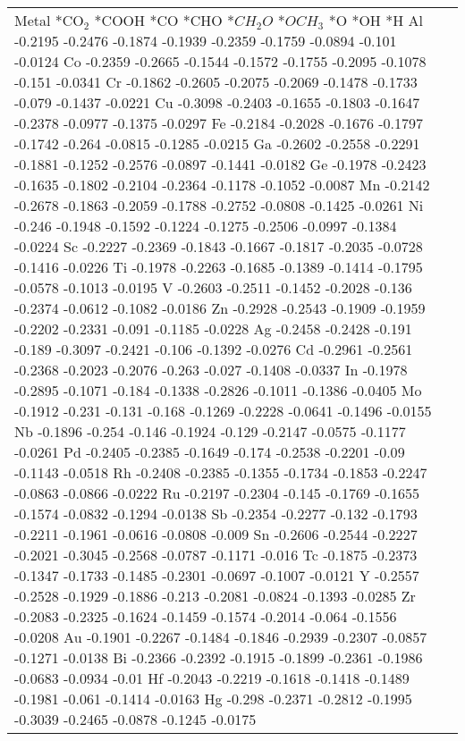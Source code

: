 \begin{table}[h]
    \centering
    \begin{tabular}{lr}
      \hline
      Metal	*CO$_2$	*COOH	*CO	*CHO	*$CH_2O$	*$OCH_3$	*O	*OH	*H
      \hline
      Al	-0.2195	-0.2476	-0.1874	-0.1939	-0.2359	-0.1759	-0.0894	-0.101	-0.0124
      Co	-0.2359	-0.2665	-0.1544	-0.1572	-0.1755	-0.2095	-0.1078	-0.151	-0.0341
      Cr	-0.1862	-0.2605	-0.2075	-0.2069	-0.1478	-0.1733	-0.079	-0.1437	-0.0221
      Cu	-0.3098	-0.2403	-0.1655	-0.1803	-0.1647	-0.2378	-0.0977	-0.1375	-0.0297
      Fe	-0.2184	-0.2028	-0.1676	-0.1797	-0.1742	-0.264	-0.0815	-0.1285	-0.0215
      Ga	-0.2602	-0.2558	-0.2291	-0.1881	-0.1252	-0.2576	-0.0897	-0.1441	-0.0182
      Ge	-0.1978	-0.2423	-0.1635	-0.1802	-0.2104	-0.2364	-0.1178	-0.1052	-0.0087
      Mn	-0.2142	-0.2678	-0.1863	-0.2059	-0.1788	-0.2752	-0.0808	-0.1425	-0.0261
      Ni	-0.246	-0.1948	-0.1592	-0.1224	-0.1275	-0.2506	-0.0997	-0.1384	-0.0224
      Sc	-0.2227	-0.2369	-0.1843	-0.1667	-0.1817	-0.2035	-0.0728	-0.1416	-0.0226
      Ti	-0.1978	-0.2263	-0.1685	-0.1389	-0.1414	-0.1795	-0.0578	-0.1013	-0.0195
      V	  -0.2603	-0.2511	-0.1452	-0.2028	-0.136	-0.2374	-0.0612	-0.1082	-0.0186
      Zn	-0.2928	-0.2543	-0.1909	-0.1959	-0.2202	-0.2331	-0.091	-0.1185	-0.0228
      Ag	-0.2458	-0.2428	-0.191	-0.189	-0.3097	-0.2421	-0.106	-0.1392	-0.0276
      Cd	-0.2961	-0.2561	-0.2368	-0.2023	-0.2076	-0.263	-0.027	-0.1408	-0.0337
      In	-0.1978	-0.2895	-0.1071	-0.184	-0.1338	-0.2826	-0.1011	-0.1386	-0.0405
      Mo	-0.1912	-0.231	-0.131	-0.168	-0.1269	-0.2228	-0.0641	-0.1496	-0.0155
      Nb	-0.1896	-0.254	-0.146	-0.1924	-0.129	-0.2147	-0.0575	-0.1177	-0.0261
      Pd	-0.2405	-0.2385	-0.1649	-0.174	-0.2538	-0.2201	-0.09	  -0.1143	-0.0518
      Rh	-0.2408	-0.2385	-0.1355	-0.1734	-0.1853	-0.2247	-0.0863	-0.0866	-0.0222
      Ru	-0.2197	-0.2304	-0.145	-0.1769	-0.1655	-0.1574	-0.0832	-0.1294	-0.0138
      Sb	-0.2354	-0.2277	-0.132	-0.1793	-0.2211	-0.1961	-0.0616	-0.0808	-0.009
      Sn	-0.2606	-0.2544	-0.2227	-0.2021	-0.3045	-0.2568	-0.0787	-0.1171	-0.016
      Tc	-0.1875	-0.2373	-0.1347	-0.1733	-0.1485	-0.2301	-0.0697	-0.1007	-0.0121
      Y	  -0.2557	-0.2528	-0.1929	-0.1886	-0.213	-0.2081	-0.0824	-0.1393	-0.0285
      Zr	-0.2083	-0.2325	-0.1624	-0.1459	-0.1574	-0.2014	-0.064	-0.1556	-0.0208
      Au	-0.1901	-0.2267	-0.1484	-0.1846	-0.2939	-0.2307	-0.0857	-0.1271	-0.0138
      Bi	-0.2366	-0.2392	-0.1915	-0.1899	-0.2361	-0.1986	-0.0683	-0.0934	-0.01
      Hf	-0.2043	-0.2219	-0.1618	-0.1418	-0.1489	-0.1981	-0.061	-0.1414	-0.0163
      Hg	-0.298	-0.2371	-0.2812	-0.1995	-0.3039	-0.2465	-0.0878	-0.1245	-0.0175

\end{tabular}
\end{table}

